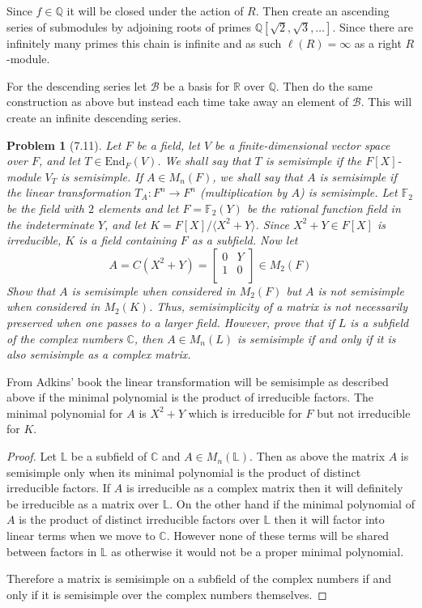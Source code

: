 \documentclass[10pt]{article}
\newcommand{\sk}{\vskip 10mm}
\newcommand{\bb}[1]{\mathbb{#1}}
\theoremstyle{plain}
\newtheorem{problem}{Problem}
\theoremstyle{remark}
\begin{document}
Since $f\in\bb{Q}$ it will be closed under the action of $R$.
Then create an ascending series of submodules by
adjoining roots of primes $\bb{Q}[\sqrt{2},\sqrt{3},\ldots]$.
Since there are infinitely many primes this chain is infinite
and as such $\ell(R)=\infty$ as a right $R$-module.

For the descending series let $\mathcal{B}$ be a basis for $\bb{R}$ over
$\bb{Q}$. Then do the same construction as above but instead each
time take away an element of $\mathcal{B}$. This will create an
infinite descending series.

\sk

\begin{problem}[7.11]
  Let $F$ be a field, let $V$ be a finite-dimensional vector space over $F$,
  and let $T\in \text{End}_F(V)$. We shall say that $T$ is semisimple if the
  $F[X]$-module $V_T$ is semisimple. If $A\in M_n(F)$, we shall say that $A$
  is semisimple if the linear transformation $T_A: F^n\rightarrow F^n$
  (multiplication by $A$) is semisimple. Let $\bb{F}_2$ be the field with
  $2$ elements and let $F=\bb{F}_2(Y)$ be the rational function field in
  the indeterminate $Y$, and let $K=F[X]/\langle X^2+Y\rangle$. Since
  $X^2+Y\in F[X]$ is irreducible, $K$ is a field containing
  $F$ as a subfield. Now let
  \[
    A=C(X^2+Y)=
    \left[
      \begin{array}{cc}
        0&Y\\
        1&0\\
      \end{array}
    \right]
    \in M_2(F)
  \]
  Show that $A$ is semisimple when considered in $M_2(F)$ but $A$ is not
  semisimple when considered in $M_2(K)$. Thus, semisimplicity of a matrix
  is not necessarily preserved when one passes to a larger field. However,
  prove that if $L$ is a subfield of the complex numbers $\bb{C}$, then
  $A\in M_n(L)$ is semisimple if and only if it is also semisimple as a complex
  matrix.
\end{problem}

From Adkins' book the linear transformation will be semisimple as
described above if the minimal polynomial is the product of irreducible
factors. The minimal polynomial for $A$ is $X^2+Y$ which is irreducible
for $F$ but not irreducible for $K$.

\begin{proof}
  Let $\bb{L}$ be a subfield of $\bb{C}$ and $A\in M_n(\bb{L})$. Then as
  above the matrix $A$ is semisimple only when its minimal polynomial
  is the product of distinct irreducible factors. If $A$ is irreducible as
  a complex matrix then it will definitely be irreducible as a matrix
  over $\bb{L}$. On the other hand if the minimal polynomial of $A$
  is the product of distinct irreducible factors over $\bb{L}$ then it
  will factor into linear terms when we move to $\bb{C}$. However none
  of these terms will be shared between factors in $\bb{L}$ as otherwise
  it would not be a proper minimal polynomial.

  Therefore a matrix is semisimple on a subfield of the complex numbers
  if and only if it is semisimple over the complex numbers themselves.
\end{proof}
\end{document}
